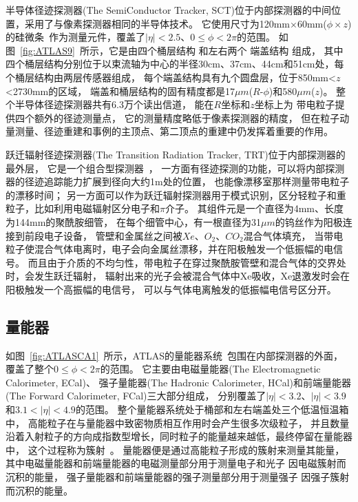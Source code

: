 半导体径迹探测器(The SemiConductor Tracker, SCT)位于内部探测器的中间位置，采用了与像素探测器相同的半导体技术。
它使用尺寸为120mm$\times$60mm($\phi\times z$)的硅微条~\cite{SCTSS}作为测量元件，覆盖了$|\eta|<2.5$、$0\le\phi<2\pi$的范围。
如图~\ref{fig:ATLAS9}~所示，它是由四个桶层结构
和左右两个
端盖结构
组成，
其中四个桶层结构分别位于以束流轴为中心的半径30cm、37cm、44cm和51cm处，每个桶层结构由两层传感器组成，
每个端盖结构具有九个圆盘层，位于850mm<$z$<2730mm的区域，
端盖和桶层结构的固有精度都是17$\mu m$($R$-$\phi$)和580$\mu m$($z$)。
整个半导体径迹探测器共有6.3万个读出信道，
能在$R$坐标和$z$坐标上为
带电粒子提供四个额外的径迹测量点，
它的测量精度略低于像素探测器的精度，
但在粒子动量测量、径迹重建和事例的主顶点、第二顶点的重建中仍发挥着重要的作用。

跃迁辐射径迹探测器(The Transition Radiation Tracker, TRT)位于内部探测器的最外层，
它是一个组合型探测器~\cite{ATLASTRT}，
一方面有径迹探测的功能，可以将内部探测器的径迹追踪能力扩展到径向大约1m处的位置，
也能像漂移室那样测量带电粒子的漂移时间；
另一方面可以作为跃迁辐射探测器用于模式识别，区分轻粒子和重粒子，比如利用电磁辐射区分电子和$\pi$介子。
其组件元是一个直径为4mm、长度为144mm的聚酰胺细管，
在每个细管中心，有一根直径为31$\mu m$的钨丝作为阳极连接到前段电子设备，
管壁和金属丝之间被$Xe$、$O_2$、$CO_2$混合气体填充，
当带电粒子使混合气体电离时，电子会向金属丝漂移，并在阳极触发一个低振幅的电信号。
而且由于介质的不均匀性，带电粒子在穿过聚酰胺管壁和混合气体的交界处时，会发生跃迁辐射，
辐射出来的光子会被混合气体中Xe吸收，Xe退激发时会在阳极触发一个高振幅的电信号，
可以与气体电离触发的低振幅电信号区分开。

\subsection{量能器}
\label{sec:ATLASCA}

如图~\ref{fig:ATLASCA1}~所示，ATLAS的量能器系统~\cite{ATLASLACA,ATLASTCA}包围在内部探测器的外面，
覆盖了整个$0\le\phi<2\pi$的范围。
它主要由电磁量能器(The Electromagnetic Calorimeter, ECal)、
强子量能器(The Hadronic Calorimeter, HCal)和前端量能器(The Forward Calorimeter, FCal)三大部分组成，
分别覆盖了$|\eta|<3.2$、$|\eta|<3.9$和$3.1<|\eta|<4.9$的范围。
整个量能器系统处于桶部和左右端盖处三个低温恒温箱中，
高能粒子在与量能器中致密物质相互作用时会产生很多次级粒子，
并且数量沿着入射粒子的方向成指数型增长，同时粒子的能量越来越低，最终停留在量能器中，
这个过程称为簇射~\cite{CABOOK}。
量能器便是通过高能粒子形成的簇射来测量其能量，
其中电磁量能器和前端量能器的电磁测量部分用于测量电子和光子
因电磁簇射而沉积的能量，
强子量能器和前端量能器的强子测量部分用于测量强子
因强子簇射而沉积的能量。

